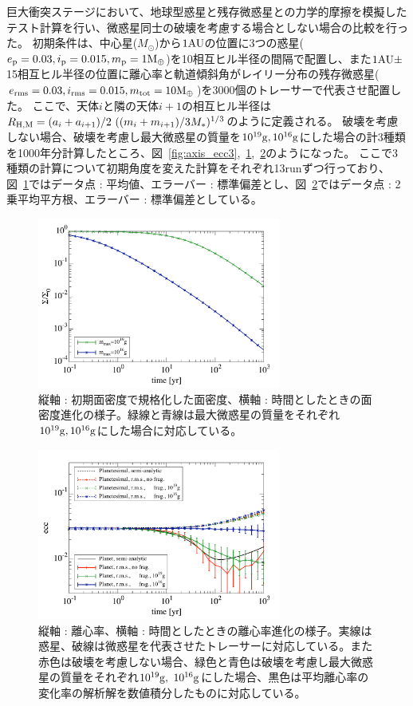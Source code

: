 \documentclass[a4paper,10pt,oneside,twocolumn,notitlepage,final]{jarticle}
\begin{document}
巨大衝突ステージにおいて、地球型惑星と残存微惑星との力学的摩擦を模擬したテスト計算を行い、微惑星同士の破壊を考慮する場合としない場合の比較を行った。
初期条件は、中心星($M_{\odot}$)から$1 {\rm AU}$の位置に3つの惑星($e_{\rm p}=0.03, i_{\rm p}=0.015, m_{\rm p}=1{\rm M_{\oplus}}$)を10相互ヒル半径の間隔で配置し、また$1 {\rm AU} \pm$ 15相互ヒル半径の位置に離心率と軌道傾斜角がレイリー分布の残存微惑星($e_{\rm rms}=0.03, i_{\rm rms}=0.015, m_{\rm tot}=10{\rm M_{\oplus}}$)を3000個のトレーサーで代表させ配置した。
ここで、天体$i$と隣の天体$i+1$の相互ヒル半径は$R_{\rm H,M}=(a_i + a_{i+1})/2~((m_i + m_{i+1})/3M_{\ast})^{1/3}$のように定義される。
破壊を考慮しない場合、破壊を考慮し最大微惑星の質量を$10^{19} {\rm g},10^{16} {\rm g}$にした場合の計3種類を1000年分計算したところ、図~\ref{fig:axis_ecc3},~\ref{fig:ecc3_sigma},~\ref{fig:ecc3_time}のようになった。
ここで3種類の計算について初期角度を変えた計算をそれぞれ13runずつ行っており、図~\ref{fig:ecc3_sigma}ではデータ点 : 平均値、エラーバー : 標準偏差とし、図~\ref{fig:ecc3_time}ではデータ点 : 2乗平均平方根、エラーバー : 標準偏差としている。


\begin{figure}[t]
 \centering
 \includegraphics[width=8cm]{./image/Ntr3E3_t1E3_dtlog_Mtot3E-5_ecc3E-2_frag_Sigma_1E19_1E16.pdf}
 \caption{縦軸 : 初期面密度で規格化した面密度、横軸 : 時間としたときの面密度進化の様子。緑線と青線は最大微惑星の質量をそれぞれ$10^{19} {\rm g},10^{16} {\rm g}$にした場合に対応している。\label{fig:ecc3_sigma}}
\end{figure}

\begin{figure}[t]
 \centering
 \includegraphics[width=8cm]{./image/Ntr3E3_t1E3_dtlog_Mtot3E-5_ecc3E-2_noacc_ecc_wf_wof.pdf}
 \caption{縦軸 : 離心率、横軸 : 時間としたときの離心率進化の様子。実線は惑星、破線は微惑星を代表させたトレーサーに対応している。また赤色は破壊を考慮しない場合、緑色と青色は破壊を考慮し最大微惑星の質量をそれぞれ$10^{19} {\rm g},~10^{16} {\rm g}$にした場合、黒色は平均離心率の変化率の解析解\citep[e.g.,][]{Ohtsuki_etal_2002}を数値積分したものに対応している。\label{fig:ecc3_time}}
\end{figure}
\end{document}
